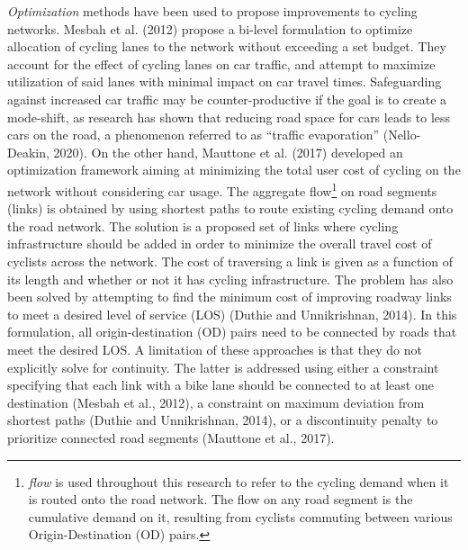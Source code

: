 \documentclass[
]{article}
\begin{document}
\emph{Optimization} methods have been used to propose improvements to
cycling networks. Mesbah et al. (2012) propose a bi-level formulation to
optimize allocation of cycling lanes to the network without exceeding a
set budget. They account for the effect of cycling lanes on car traffic,
and attempt to maximize utilization of said lanes with minimal impact on
car travel times. Safeguarding against increased car traffic may be counter-productive if the goal is to create a mode-shift, as research has shown that reducing road space for cars leads to less cars on the road, a phenomenon referred to as ``traffic evaporation'' (Nello-Deakin, 2020).
On the other hand, Mauttone et al. (2017) developed an optimization framework aiming at minimizing the total
user cost of cycling on the network without considering car usage. The aggregate flow\footnote{\emph{flow} is
  used throughout this research to refer to the cycling demand when it is
  routed onto the road network. The flow on any road segment is the
  cumulative demand on it, resulting from cyclists commuting between
  various Origin-Destination (OD) pairs.} on road segments (links) is obtained by using
shortest paths to route existing cycling demand onto the road network. The solution is a proposed set of links where cycling infrastructure
should be added in order to minimize the overall travel cost of cyclists
across the network. The cost of traversing a link is given as a function
of its length and whether or not it has cycling infrastructure. The
problem has also been solved by attempting to find the minimum cost of
improving roadway links to meet a desired level of service (LOS)
(Duthie and Unnikrishnan, 2014). In this formulation, all origin-destination
(OD) pairs need to be connected by roads that meet the desired LOS. A
limitation of these approaches is that they do not explicitly solve for
continuity. The latter is addressed using either a constraint specifying
that each link with a bike lane should be connected to at least one
destination (Mesbah et al., 2012), a constraint on maximum deviation
from shortest paths (Duthie and Unnikrishnan, 2014), or a discontinuity
penalty to prioritize connected road segments (Mauttone et al., 2017).
\end{document}
